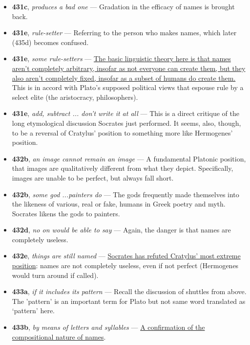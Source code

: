 \documentclass[12pt]{article}
\begin{document}
\begin{itemize}
\item \textbf{431c}, \textit{produces a bad one} --- Gradation in the efficacy of names is brought back.

\item \textbf{431e}, \textit{rule-setter} --- Referring to the person who makes names, which later (435d) becomes confused.

\item \textbf{431e}, \textit{some rule-setters} --- \ul{The basic linguistic theory here is that names aren't completely arbitrary, insofar as not everyone can create them, but they also aren't completely fixed, insofar as a subset of humans do create them.} This is in accord with Plato's supposed political views that espouse rule by a select elite (the aristocracy, philosophers). 

\item \textbf{431e}, \textit{add, subtract ... don't write it at all} --- This is a direct critique of the long etymological discussion Socrates just performed. It seems, also, though, to be a reversal of Cratylus' position to something more like Hermogenes' position.

\item \textbf{432b}, \textit{an image cannot remain an image} --- A fundamental Platonic position, that images are qualitatively different from what they depict. Specifically, images are unable to be perfect, but always fall short.

\item \textbf{432b}, \textit{some god ...painters do} --- The gods frequently made themselves into the likeness of various, real or fake, humans in Greek poetry and myth. Socrates likens the gods to painters.

\item \textbf{432d}, \textit{no on would be able to say} --- Again, the danger is that names are completely useless.

\item \textbf{432e}, \textit{things are still named} --- \ul{Socrates has refuted Cratylus' most extreme position}: names are not completely useless, even if not perfect (Hermogenes would turn around if called).

\item \textbf{433a}, \textit{if it includes its pattern} --- Recall the discussion of shuttles from above. The 'pattern' is an important term for Plato but not same word translated as `pattern' here.

\item \textbf{433b}, \textit{by means of letters and syllables} --- \ul{A confirmation of the compositional nature of names}.


\end{itemize}
\end{document}
